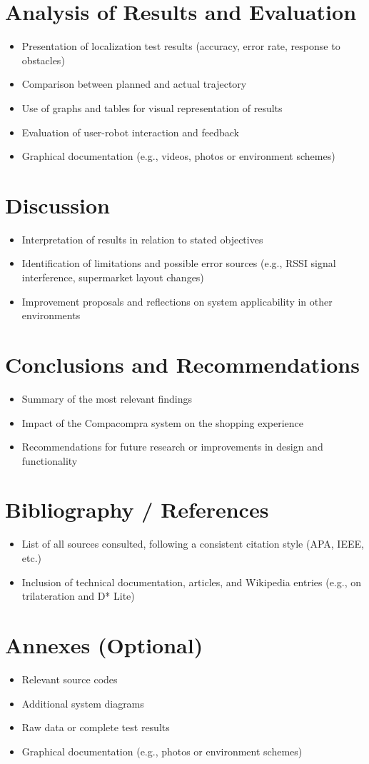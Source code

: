 \documentclass[a4paper,11pt]{article}
\begin{document}
\section{Analysis of Results and Evaluation}
\begin{itemize}
\item Presentation of localization test results (accuracy, error rate, response to obstacles)
\item Comparison between planned and actual trajectory
\item Use of graphs and tables for visual representation of results
\item Evaluation of user-robot interaction and feedback
\item Graphical documentation (e.g., videos, photos or environment schemes)
\end{itemize}

\section{Discussion}
\begin{itemize}
\item Interpretation of results in relation to stated objectives
\item Identification of limitations and possible error sources (e.g., RSSI signal interference, supermarket layout changes)
\item Improvement proposals and reflections on system applicability in other environments
\end{itemize}
\section{Conclusions and Recommendations}
\begin{itemize}
\item Summary of the most relevant findings
\item Impact of the Compacompra system on the shopping experience
\item Recommendations for future research or improvements in design and functionality
\end{itemize}

\section{Bibliography / References}
\begin{itemize}
\item List of all sources consulted, following a consistent citation style (APA, IEEE, etc.)
\item Inclusion of technical documentation, articles, and Wikipedia entries (e.g., on trilateration and D* Lite)
\end{itemize}

\section{Annexes (Optional)}
\begin{itemize}
\item Relevant source codes
\item Additional system diagrams
\item Raw data or complete test results
\item Graphical documentation (e.g., photos or environment schemes)
\end{itemize}
\end{document}
